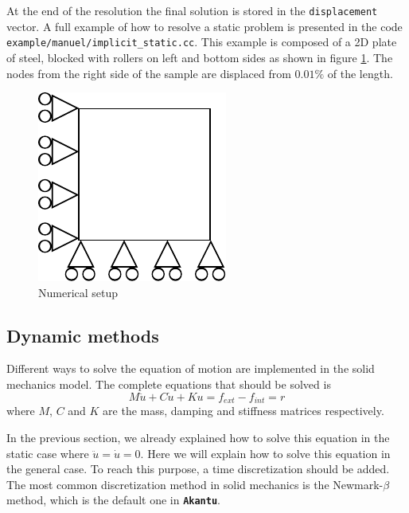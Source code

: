 \documentclass[a4paper,11pt]{book}
\newcommand{\akantu}{\texttt{\textbf{Akantu}}\xspace}
\newcommand{\code}[1]{\texttt{#1}}
\begin{document}
At  the   end  of  the   resolution  the  final   solution  is  stored   in  the
\code{displacement} vector.  A  full example of how to  resolve a static problem
is  presented  in   the  code  \code{example/manuel/implicit\_static.cc}.   This
example is  composed of a 2D  plate of steel,  blocked with rollers on  left and
bottom sides as  shown in figure \ref{fig:smm:static}. The  nodes from the right
side of the sample are displaced from $0.01\%$ of the length.

\begin{figure}[!htb]
  \centering
  \includegraphics{figures/implicit_static}
  \caption{Numerical setup\label{fig:smm:static}}
\end{figure}


\subsection{Dynamic methods} \label{sect:smm:Dynamic_methods}

Different ways  to solve  the equation  of motion are  implemented in  the solid
mechanics model.  The complete equations that should be solved is
\begin{equation}\label{eqn:equation-motion}
M\ddot{u} + C\dot{u} + Ku = f_{ext} -f_{int} = r
\end{equation}
where  $M$,  $C$   and  $K$  are  the  mass,   damping  and  stiffness  matrices
respectively.

In the previous section, we already  explained how to solve this equation in the
static case where $\ddot{u}  = \dot{u} = 0$.  Here we will  explain how to solve
this equation in the general case.  To reach this purpose, a time discretization
should be added. The most common discretization method in solid mechanics is the
Newmark-$\beta$ method, which is the default one in \akantu.
\end{document}
